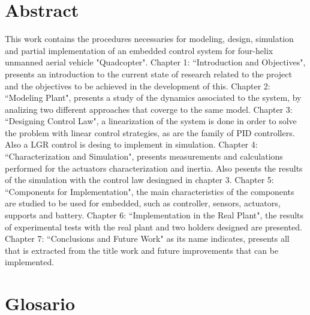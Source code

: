 \documentclass[../main.tex]{subfiles}
\begin{document}
\section*{Abstract}	
This work contains the procedures necessaries for modeling, design, simulation and partial implementation of an embedded control system for four-helix unmanned aerial vehicle "Quadcopter".
\hfill \break
Chapter 1: “Introduction and Objectives", presents an introduction to the current state of research related to the project and the objectives to be achieved in the development of this.
\hfill \break
Chapter 2: “Modeling Plant", presents a study of the dynamics associated to the system, by analizing two different approaches that coverge to the same model.
\hfill \break
Chapter 3: “Designing Control Law", a linearization of the system is done in order to solve the problem with linear control strategies, as are the family of PID controllers. Also a LGR control is desing to implement in simulation. 
\hfill \break
Chapter 4: “Characterization and Simulation", presents measurements and calculations performed for the actuators characterization and inertia. Also pesents the results of the simulation with the control law desingned in chapter 3.
\hfill \break
Chapter 5: “Components for Implementation", the main characteristics of the components are studied to be used for embedded, such as controller, sensors, actuators, supports and battery.
\hfill \break
Chapter 6: “Implementation in the Real Plant", the results of experimental tests with the real plant and two holders designed are presented.
\hfill \break
Chapter 7: “Conclusions and Future Work" as its name indicates, presents all that is extracted from the title work and future improvements that can be implemented.
	
	\newpage
		
	\section*{Glosario}
	
\end{document}

